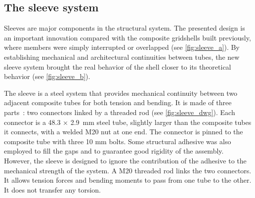 



\subsection{The sleeve system}

Sleeves are major components in the structural system. The presented design is an important innovation compared with the composite gridshells built previously, where members were simply interrupted or overlapped (see \cref{fig:sleeve_a}). By establishing mechanical and architectural continuities between tubes, the new sleeve system brought the real behavior of the shell closer to its theoretical behavior (see \cref{fig:sleeve_b}).

The sleeve is a steel system that provides mechanical continuity between two adjacent composite tubes for both tension and bending. It is made of three parts~: two connectors linked by a threaded rod (see \cref{fig:sleeve_dwg}). Each connector is a 48.3 × \SI{2.9}{mm} steel tube, slightly larger than the composite tubes it connects, with a welded M20 nut at one end. The connector is pinned to the composite tube with three 10 mm bolts. Some structural adhesive was also employed to fill the gaps and to guarantee good rigidity of the assembly. However, the sleeve is designed to ignore the contribution of the adhesive to the mechanical strength of the system. A M20 threaded rod links the two connectors. It allows tension forces and bending moments to pass from one tube to the other. It does not transfer any torsion.

